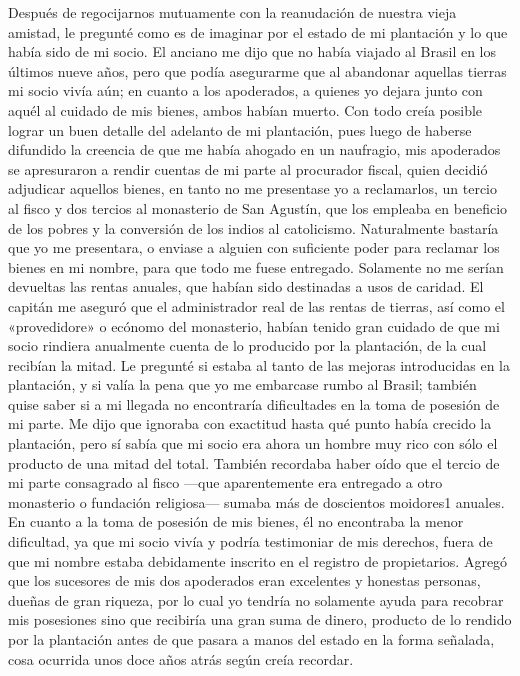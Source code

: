 \documentclass{novela}
\begin{document}
    Después de regocijarnos mutuamente con la reanudación de nuestra vieja amistad, le pregunté como es de imaginar por el estado de mi plantación y lo que había sido de mi socio. El anciano me dijo que no había viajado al Brasil en los últimos nueve años, pero que podía asegurarme que al abandonar aquellas tierras mi socio vivía aún; en cuanto a los apoderados, a quienes yo dejara junto con aquél al cuidado de mis bienes, ambos habían muerto.
    Con todo creía posible lograr un buen detalle del adelanto de mi plantación, pues luego de haberse difundido la creencia de que me había ahogado en un naufragio, mis apoderados se apresuraron a rendir cuentas de mi parte al procurador fiscal, quien decidió adjudicar aquellos bienes, en tanto no me presentase yo a reclamarlos, un tercio al fisco y dos tercios al monasterio de San Agustín, que los empleaba en beneficio de los pobres y la conversión de los indios al catolicismo.
    Naturalmente bastaría que yo me presentara, o enviase a alguien con suficiente poder para reclamar los bienes en mi nombre, para que todo me fuese entregado. Solamente no me serían devueltas las rentas anuales, que habían sido destinadas a usos de caridad. El capitán me aseguró que el administrador real de las rentas de tierras, así como el «provedidore» o ecónomo del monasterio, habían tenido gran cuidado de que mi socio rindiera anualmente cuenta de lo producido por la plantación, de la cual recibían la mitad.
    Le pregunté si estaba al tanto de las mejoras introducidas en la plantación, y si valía la pena que yo me embarcase rumbo al Brasil; también quise saber si a mi llegada no encontraría dificultades en la toma de posesión de mi parte. Me dijo que ignoraba con exactitud hasta qué punto había crecido la plantación, pero sí sabía que mi socio era ahora un hombre muy rico con sólo el producto de una mitad del total. También recordaba haber oído que el tercio de mi parte consagrado al fisco —que aparentemente era entregado a otro monasterio o fundación religiosa— sumaba más de doscientos moidores1 anuales.
    En cuanto a la toma de posesión de mis bienes, él no encontraba la menor dificultad, ya que mi socio vivía y podría testimoniar de mis derechos, fuera de que mi nombre estaba debidamente inscrito en el registro de propietarios.
    Agregó que los sucesores de mis dos apoderados eran excelentes y honestas personas, dueñas de gran riqueza, por lo cual yo tendría no solamente ayuda para recobrar mis posesiones sino que recibiría una gran suma de dinero, producto de lo rendido por la plantación antes de que pasara a manos del estado en la forma señalada, cosa ocurrida unos doce años atrás según creía recordar.
\end{document}
